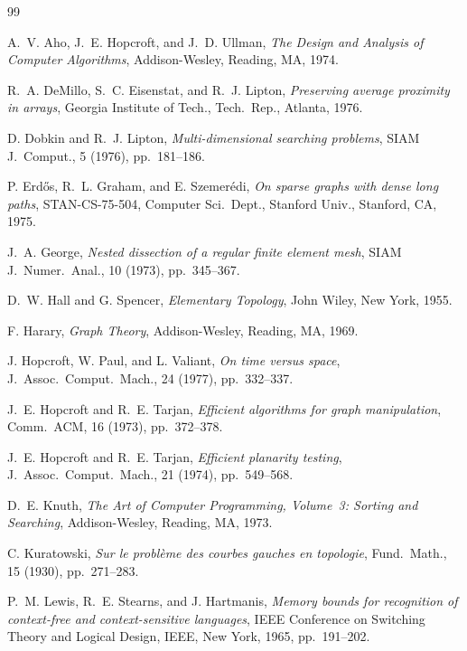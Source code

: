 \documentclass[12pt]{article}
\theoremstyle{remark}
\begin{document}
\begin{thebibliography}{99}

A.~V. Aho, J.~E. Hopcroft, and J.~D. Ullman, \textit{The Design and Analysis of
Computer Algorithms}, Addison-Wesley, Reading, MA, 1974.

R.~A. DeMillo, S.~C. Eisenstat, and R.~J. Lipton, \textit{Preserving average
proximity in arrays}, Georgia Institute of Tech., Tech.\ Rep., Atlanta, 1976.

D. Dobkin and R.~J. Lipton, \textit{Multi-dimensional searching problems}, SIAM
J.\ Comput., 5 (1976), pp.~181--186.

P. Erd\H{o}s, R.~L. Graham, and E. Szemer\'{e}di, \textit{On sparse graphs with
dense long paths}, STAN-CS-75-504, Computer Sci.\ Dept., Stanford Univ., Stanford,
CA, 1975.

J.~A. George, \textit{Nested dissection of a regular finite element mesh}, SIAM
J.\ Numer.\ Anal., 10 (1973), pp.~345--367.

D.~W. Hall and G. Spencer, \textit{Elementary Topology}, John Wiley, New York, 1955.

F. Harary, \textit{Graph Theory}, Addison-Wesley, Reading, MA, 1969.

J. Hopcroft, W. Paul, and L. Valiant, \textit{On time versus space}, J.\ Assoc.\
Comput.\ Mach., 24 (1977), pp.~332--337.

J.~E. Hopcroft and R.~E. Tarjan, \textit{Efficient algorithms for graph
manipulation}, Comm.\ ACM, 16 (1973), pp.~372--378.

J.~E. Hopcroft and R.~E. Tarjan, \textit{Efficient planarity testing}, J.\ Assoc.\
Comput.\ Mach., 21 (1974), pp.~549--568.

D.~E. Knuth, \textit{The Art of Computer Programming, Volume~3: Sorting and
Searching}, Addison-Wesley, Reading, MA, 1973.

C. Kuratowski, \textit{Sur le probl\`{e}me des courbes gauches en topologie}, Fund.\
Math., 15 (1930), pp.~271--283.

\bibitem{lewis65}
P.~M. Lewis, R.~E. Stearns, and J. Hartmanis, \textit{Memory bounds for recognition
of context-free and context-sensitive languages}, IEEE Conference on Switching Theory
and Logical Design, IEEE, New York, 1965, pp.~191--202.


\end{thebibliography}
\end{document}
